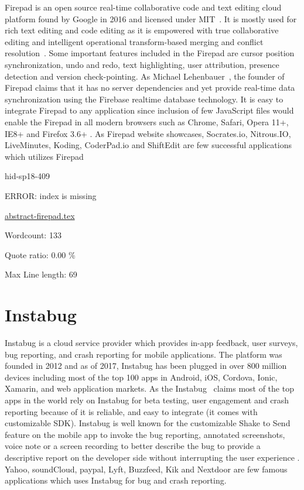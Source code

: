 Firepad is an open source real-time collaborative code and text
editing cloud platform found by Google in 2016 and licensed under
MIT~\cite{hid-sp18-409-www-firepad}.  It is mostly used for rich text
editing and code editing as it is empowered with true collaborative
editing and intelligent operational transform-based merging and
conflict resolution~\cite{hid-sp18-409-www-firepad-wikipedia}. Some
important features included in the Firepad are cursor position
synchronization, undo and redo, text highlighting, user attribution,
presence detection and version check-pointing. As Michael
Lehenbauer~\cite{hid-sp18-409-www-firepad}, the founder of Firepad
claims that it has no server dependencies and yet provide real-time
data synchronization using the Firebase realtime database technology.
It is easy to integrate Firepad to any application since inclusion of
few JavaScript files would enable the Firepad in all modern browsers
such as Chrome, Safari, Opera 11+, IE8+ and Firefox 3.6+
\cite{hid-sp18-409-www-firepad}. As Firepad website showcases,
Socrates.io, Nitrous.IO, LiveMinutes, Koding, CoderPad.io and
ShiftEdit are few successful applications which utilizes
Firepad~\cite{hid-sp18-409-www-databricks}


\begin{IU}

hid-sp18-409

ERROR: index is missing

\href{https://github.com/cloudmesh-community/hid-sp18-409/blob/master//technology/abstract-firepad.tex}{abstract-firepad.tex}

 

Wordcount: 133


Quote ratio: 0.00 \%
 
Max Line length: 69
\end{IU}

\section{Instabug}

Instabug is a cloud service provider which provides in-app feedback,
user surveys, bug reporting, and crash reporting for mobile
applications. The platform was founded in 2012 and as of 2017,
Instabug has been plugged in over 800 million devices including most
of the top 100 apps in Android, iOS, Cordova, Ionic, Xamarin, and web
application markets\cite{hid-sp18-409-www-instabug}. As the
Instabug~\cite{hid-sp18-409-www-instabug} claims most of the top apps
in the world rely on Instabug for beta testing, user engagement and
crash reporting because of it is reliable, and easy to integrate (it
comes with customizable SDK). Instabug is well known for the
customizable Shake to Send feature on the mobile app to invoke the bug
reporting, annotated screenshots, voice note or a screen recording to
better describe the bug to provide a descriptive report on the
developer side without interrupting the user experience
\cite{hid-sp18-409-www-instabug-wikipedia}. Yahoo, soundCloud, paypal,
Lyft, Buzzfeed, Kik and Nextdoor are few famous applications which
uses Instabug for bug and crash
reporting\cite{hid-sp18-409-www-instabug}.



